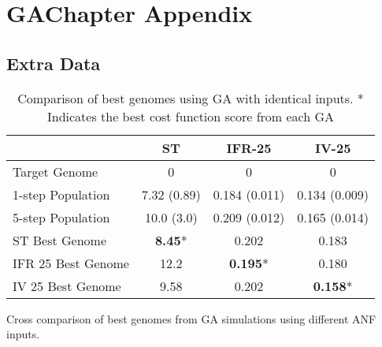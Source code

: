 
\section{GAChapter Appendix}\label{sec:GA:chapter-5-appendix}

\subsection{Extra Data}

\begin{table}[htp]
  \centering
  \caption{Comparison of best genomes using {GA} with
    identical inputs. * Indicates the best cost function score from
    each {GA}}\label{tab:GA:4}
  \begin{tabular}{lccc}
\toprule
                   &       ST       &     IFR-25      & IV-25 \\
\midrule
  Target Genome    &       0        &        0        & 0 \\ %
1-step Population  &  7.32 (0.89)   &  0.184 (0.011)  & 0.134 (0.009)\\ %
5-step Population  &   10.0 (3.0)   &  0.209 (0.012)  & 0.165 (0.014) \\ %
 ST Best Genome    & \textbf{8.45}* &      0.202      & 0.183 \\ %
IFR 25 Best Genome  &      12.2      & \textbf{0.195}* & 0.180 \\ %
IV 25 Best Genome  &      9.58      &      0.202      & \textbf{0.158}* \\ %
\bottomrule
\end{tabular}
\end{table}


\begin{table}[tbh]
  \centering
  \caption{Cross comparison of best genomes from GA simulations using different ANF inputs.}
  \label{tab:GA:XComp}
  
\end{table}




